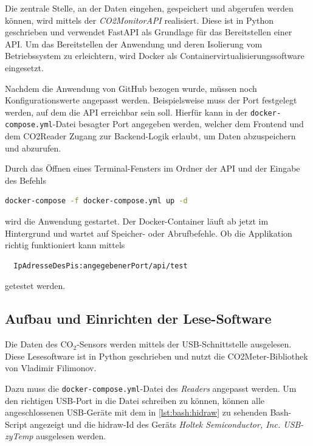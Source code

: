 \documentclass[a4paper,
    11pt,
    headings=small,
    ngerman,
    listof=totoc,
    numbers=noenddot]{scrreprt}[2021/11/13]
\begin{document}
Die zentrale Stelle, an der Daten eingehen, gespeichert und abgerufen werden können, wird mittels der \textit{CO2MonitorAPI} realisiert. Diese ist in Python geschrieben und verwendet FastAPI als Grundlage für das Bereitstellen einer API. Um das Bereitstellen der Anwendung und deren  Isolierung vom Betriebssystem zu erleichtern, wird Docker als Containervirtualisierungssoftware eingesetzt.

Nachdem die Anwendung von GitHub bezogen wurde, müssen noch Konfigurationswerte angepasst werden. Beispielsweise muss der Port festgelegt werden, auf dem die \ac{API} erreichbar sein soll. Hierfür kann in der \texttt{docker-compose.yml}-Datei besagter Port angegeben werden, welcher dem Frontend und dem CO2Reader Zugang zur Backend-Logik erlaubt, um Daten abzuspeichern und abzurufen.

Durch das Öffnen eines Terminal-Fensters im Ordner der \ac{API} und der Eingabe des Befehls

\begin{lstlisting}[language=Bash]
  docker-compose -f docker-compose.yml up -d
\end{lstlisting}

wird die Anwendung gestartet. Der Docker-Container läuft ab jetzt im Hintergrund und wartet auf Speicher- oder Abrufbefehle. Ob die Applikation richtig funktioniert kann mittels 

\begin{lstlisting}
  IpAdresseDesPis:angegebenerPort/api/test
\end{lstlisting}

getestet werden.


\subsection{Aufbau und Einrichten der Lese-Software}

Die Daten des CO$_2$-Sensors werden mittels der USB-Schnittstelle ausgelesen. Diese Lesesoftware ist in Python geschrieben und nutzt die CO2Meter-Bibliothek von Vladimir Filimonov.
\autocite{github_co2meter}

Dazu muss die \texttt{docker-compose.yml}-Datei des \textit{Readers} angepasst werden. Um den richtigen USB-Port in die Datei schreiben zu können, können alle angeschlossenen USB-Geräte mit dem in \cref{lst:bash:hidraw} zu sehenden Bash-Script angezeigt und die hidraw-Id des Geräts \textit{Holtek Semiconductor, Inc. USB-zyTemp} ausgelesen werden. \autocite{get_usb_hidraw}
\end{document}
